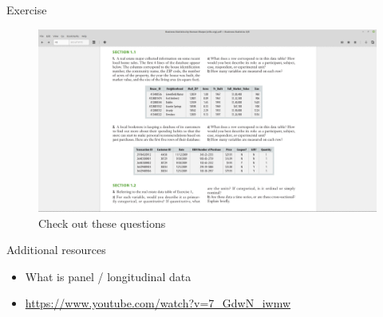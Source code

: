 \documentclass[
  ignorenonframetext,
]{beamer}
\begin{document}
\begin{frame}{Exercise}
\protect\hypertarget{exercise-1}{}
\begin{figure}
\centering
\includegraphics{exercise.png}
\caption{Check out these questions}
\end{figure}
\end{frame}

\begin{frame}{Additional resources}
\protect\hypertarget{additional-resources}{}
\begin{itemize}
\item
  What is panel / longitudinal data
\item
  \url{https://www.youtube.com/watch?v=7_GdwN_iwmw}
\end{itemize}
\end{frame}
\end{document}
